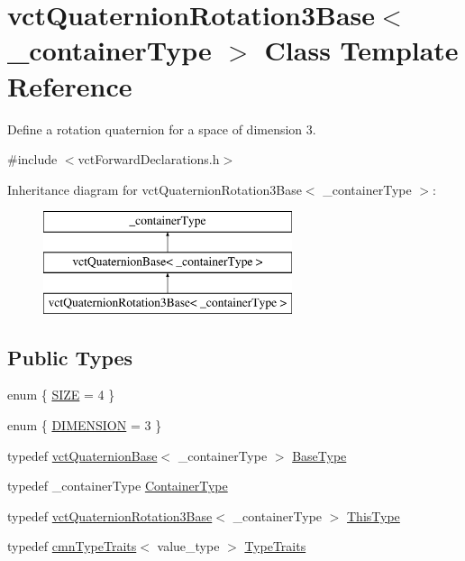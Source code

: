 \hypertarget{classvct_quaternion_rotation3_base}{}\section{vct\+Quaternion\+Rotation3\+Base$<$ \+\_\+container\+Type $>$ Class Template Reference}
\label{classvct_quaternion_rotation3_base}


Define a rotation quaternion for a space of dimension 3.  




{\ttfamily \#include $<$vct\+Forward\+Declarations.\+h$>$}

Inheritance diagram for vct\+Quaternion\+Rotation3\+Base$<$ \+\_\+container\+Type $>$\+:\begin{figure}[H]
\begin{center}
\leavevmode
\includegraphics[height=3.000000cm]{db/d76/classvct_quaternion_rotation3_base}
\end{center}
\end{figure}
\subsection*{Public Types}
\begin{DoxyCompactItemize}
\item 
enum \{ \hyperlink{classvct_quaternion_rotation3_base_a6baf2fda4760908cbc94c53f79838804a42527344f7f8ba3f199c418756497bc1}{S\+I\+Z\+E} = 4
 \}
\item 
enum \{ \hyperlink{classvct_quaternion_rotation3_base_a729ac03acdd5949ecf382629e563d2a0a9417132a8a6849e18439d903ae6a1f18}{D\+I\+M\+E\+N\+S\+I\+O\+N} = 3
 \}
\item 
typedef \hyperlink{classvct_quaternion_base}{vct\+Quaternion\+Base}$<$ \+\_\+container\+Type $>$ \hyperlink{classvct_quaternion_rotation3_base_aec53a8354bebb034598fe2b02ffc8217}{Base\+Type}
\item 
typedef \+\_\+container\+Type \hyperlink{classvct_quaternion_rotation3_base_a41c3b08279a5560f43351c14666c9c6a}{Container\+Type}
\item 
typedef \hyperlink{classvct_quaternion_rotation3_base}{vct\+Quaternion\+Rotation3\+Base}$<$ \+\_\+container\+Type $>$ \hyperlink{classvct_quaternion_rotation3_base_aff1feb6ba01e2cbc6f455a140992e728}{This\+Type}
\item 
typedef \hyperlink{classcmn_type_traits}{cmn\+Type\+Traits}$<$ value\+\_\+type $>$ \hyperlink{classvct_quaternion_rotation3_base_a78f36636344dd97b9837f9b15aedd1f7}{Type\+Traits}
\end{DoxyCompactItemize}
